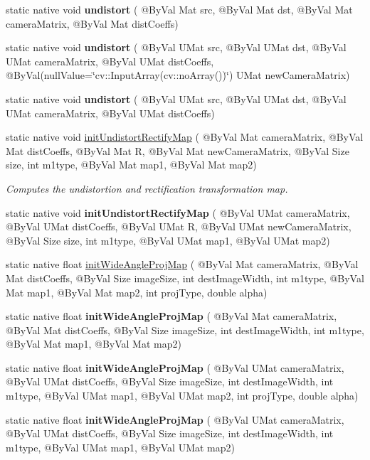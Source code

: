 \begin{DoxyCompactItemize}
static native void {\bfseries undistort} ( @By\+Val Mat src, @By\+Val Mat dst, @By\+Val Mat camera\+Matrix, @By\+Val Mat dist\+Coeffs)
\item 
static native void {\bfseries undistort} ( @By\+Val U\+Mat src, @By\+Val U\+Mat dst, @By\+Val U\+Mat camera\+Matrix, @By\+Val U\+Mat dist\+Coeffs, @By\+Val(null\+Value=\char`\"{}cv\+::\+Input\+Array(cv\+::no\+Array())\char`\"{}) U\+Mat new\+Camera\+Matrix)
\item 
static native void {\bfseries undistort} ( @By\+Val U\+Mat src, @By\+Val U\+Mat dst, @By\+Val U\+Mat camera\+Matrix, @By\+Val U\+Mat dist\+Coeffs)
\item 
static native void \hyperlink{group__imgproc__transform_gaf3c4192c811a2204d996dacf82f23564}{init\+Undistort\+Rectify\+Map} ( @By\+Val Mat camera\+Matrix, @By\+Val Mat dist\+Coeffs, @By\+Val Mat R, @By\+Val Mat new\+Camera\+Matrix, @By\+Val Size size, int m1type, @By\+Val Mat map1, @By\+Val Mat map2)
\begin{DoxyCompactList}\small\item\em Computes the undistortion and rectification transformation map. \end{DoxyCompactList}\item 
static native void {\bfseries init\+Undistort\+Rectify\+Map} ( @By\+Val U\+Mat camera\+Matrix, @By\+Val U\+Mat dist\+Coeffs, @By\+Val U\+Mat R, @By\+Val U\+Mat new\+Camera\+Matrix, @By\+Val Size size, int m1type, @By\+Val U\+Mat map1, @By\+Val U\+Mat map2)
\item 
static native float \hyperlink{group__imgproc__transform_ga797a671a89ffc5375a87366fbbb86c13}{init\+Wide\+Angle\+Proj\+Map} ( @By\+Val Mat camera\+Matrix, @By\+Val Mat dist\+Coeffs, @By\+Val Size image\+Size, int dest\+Image\+Width, int m1type, @By\+Val Mat map1, @By\+Val Mat map2, int proj\+Type, double alpha)
\item 
static native float {\bfseries init\+Wide\+Angle\+Proj\+Map} ( @By\+Val Mat camera\+Matrix, @By\+Val Mat dist\+Coeffs, @By\+Val Size image\+Size, int dest\+Image\+Width, int m1type, @By\+Val Mat map1, @By\+Val Mat map2)
\item 
static native float {\bfseries init\+Wide\+Angle\+Proj\+Map} ( @By\+Val U\+Mat camera\+Matrix, @By\+Val U\+Mat dist\+Coeffs, @By\+Val Size image\+Size, int dest\+Image\+Width, int m1type, @By\+Val U\+Mat map1, @By\+Val U\+Mat map2, int proj\+Type, double alpha)
\item 
static native float {\bfseries init\+Wide\+Angle\+Proj\+Map} ( @By\+Val U\+Mat camera\+Matrix, @By\+Val U\+Mat dist\+Coeffs, @By\+Val Size image\+Size, int dest\+Image\+Width, int m1type, @By\+Val U\+Mat map1, @By\+Val U\+Mat map2)

\end{DoxyCompactItemize}
